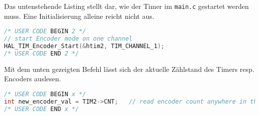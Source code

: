 Das untenstehende Listing stellt dar, wie der Timer im \texttt{main.c} gestartet werden muss.
Eine Initialisierung alleine reicht nicht aus.

\begin{lstlisting}[language=c]
/* USER CODE BEGIN 2 */
// start Encoder mode on one channel
HAL_TIM_Encoder_Start(&htim2, TIM_CHANNEL_1);
/* USER CODE END 2 */
\end{lstlisting}

Mit dem unten gezeigten Befehl lässt sich der aktuelle Zählstand des Timers resp. Encoders auslesen.

\begin{lstlisting}[language=c]
/* USER CODE BEGIN x */
int new_encoder_val = TIM2->CNT;   // read encoder count anywhere in the code 
/* USER CODE END x */
\end{lstlisting}




